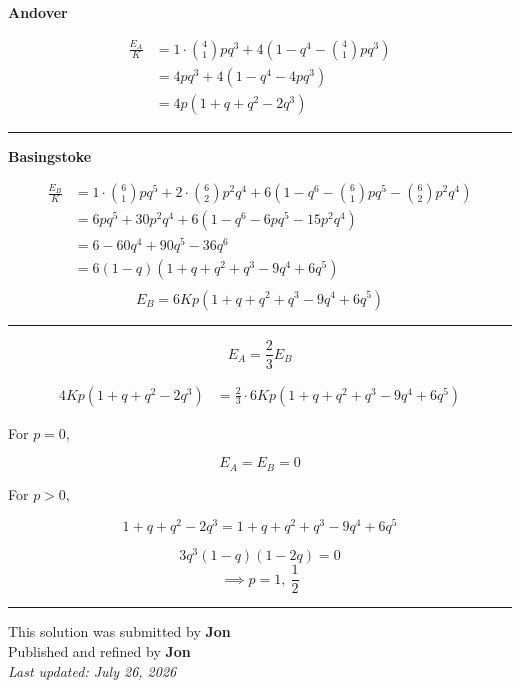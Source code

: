 \documentclass[12pt]{article}
\begin{document}
\newcommand{\ds}{\displaystyle}


\textbf{Andover}

\begin{align*}
\frac{E_A}{K}
&=1\cdot \binom41pq^3
+4\left(1-q^4-\binom41pq^3\right)\\
&=4pq^3+4(1-q^4-4pq^3)\\
&=4p(1+q+q^2-2q^3)
\end{align*}

\bigskip\hrule\bigskip

\textbf{Basingstoke}

\begin{align*}
\frac{E_B}{K}
&=1\cdot \binom61pq^5
+2\cdot \binom62p^2q^4
+6\left(1-q^6-\binom61pq^5-\binom62p^2q^4\right)\\
&=6pq^5+30p^2q^4+6(1-q^6-6pq^5-15p^2q^4)\\
&=6-60q^4+90q^5-36q^6\\
&=6(1-q)(1+q+q^2+q^3-9q^4+6q^5)\\
\end{align*}
$$E_B=6Kp(1+q+q^2+q^3-9q^4+6q^5)$$

\bigskip\hrule\bigskip

$$E_A=\frac23E_B$$

\begin{align*}
4Kp(1+q+q^2-2q^3)
&=\frac23\cdot 6Kp(1+q+q^2+q^3-9q^4+6q^5)
\end{align*}

For $p=0$,

$$E_A=E_B=0$$

For $p>0$,

$$1+q+q^2-2q^3=1+q+q^2+q^3-9q^4+6q^5$$

$$3q^3(1-q)(1-2q)=0$$
$$\implies p=1,\ \frac12$$


\bigskip
\hrule
\begin{center}
    This solution was submitted by \textbf{Jon}\\[4pt]
    Published and refined by \textbf{Jon}\\[8pt]
    \textit{Last updated: July 26, 2026}
\end{center}
\end{document}
